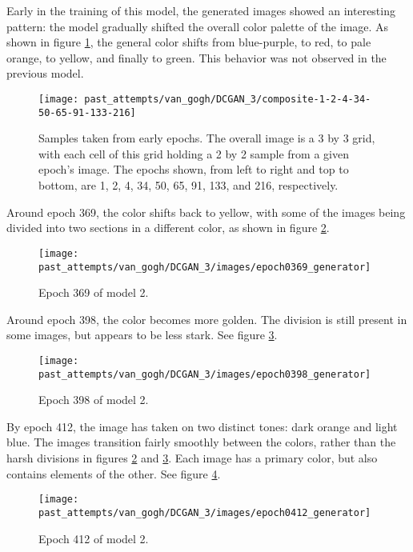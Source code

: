 \documentclass[11pt,letterpaper]{article}
\begin{document}
				Early in the training of this model, the generated images showed an interesting pattern: the model gradually shifted the overall color palette of the image.
				As shown in figure \ref{fig:cgvg:composite-1-2-4-34-50-65-91-133-216}, the general color shifts from blue-purple, to red, to pale orange, to yellow, and finally to green.
				This behavior was not observed in the previous model.
				\begin{figure}
					\centering
					\texttt{[image: past\_attempts/van\_gogh/DCGAN\_3/composite-1-2-4-34-50-65-91-133-216]}
					\caption[Samples of images from early epochs]{Samples taken from early epochs. The overall image is a 3 by 3 grid, with each cell of this grid holding a 2 by 2 sample from a given epoch's image. The epochs shown, from left to right and top to bottom, are 1, 2, 4, 34, 50, 65, 91, 133, and 216, respectively.}
					\label{fig:cgvg:composite-1-2-4-34-50-65-91-133-216}
				\end{figure}

				Around epoch 369, the color shifts back to yellow, with some of the images being divided into two sections in a different color, as shown in figure \ref{fig:cgvg:epoch0369generator}.
				\begin{figure}
					\centering
					\texttt{[image: past\_attempts/van\_gogh/DCGAN\_3/images/epoch0369\_generator]}
					\caption{Epoch 369 of model 2.}
					\label{fig:cgvg:epoch0369generator}
				\end{figure}

				Around epoch 398, the color becomes more golden.
				The division is still present in some images, but appears to be less stark.
				See figure \ref{fig:cgvg:epoch0398generator}.
				\begin{figure}
					\centering
					\texttt{[image: past\_attempts/van\_gogh/DCGAN\_3/images/epoch0398\_generator]}
					\caption{Epoch 398 of model 2.}
					\label{fig:cgvg:epoch0398generator}
				\end{figure}

				By epoch 412, the image has taken on two distinct tones: dark orange and light blue.
				The images transition fairly smoothly between the colors, rather than the harsh divisions in figures \ref{fig:cgvg:epoch0369generator} and \ref{fig:cgvg:epoch0398generator}.
				Each image has a primary color, but also contains elements of the other.
				See figure \ref{fig:cgvg:epoch0412generator}.
				\begin{figure}
					\centering
					\texttt{[image: past\_attempts/van\_gogh/DCGAN\_3/images/epoch0412\_generator]}
					\caption{Epoch 412 of model 2.}
					\label{fig:cgvg:epoch0412generator}
				\end{figure}
\end{document}
